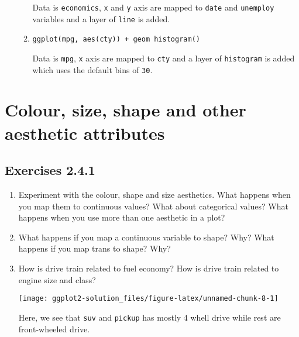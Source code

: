 \documentclass[]{book}
\newenvironment{Shaded}{\begin{snugshade}}{\end{snugshade}}
\newcommand{\KeywordTok}[1]{\textcolor[rgb]{0.13,0.29,0.53}{\textbf{#1}}}
\newcommand{\DataTypeTok}[1]{\textcolor[rgb]{0.13,0.29,0.53}{#1}}
\newcommand{\StringTok}[1]{\textcolor[rgb]{0.31,0.60,0.02}{#1}}
\newcommand{\OperatorTok}[1]{\textcolor[rgb]{0.81,0.36,0.00}{\textbf{#1}}}
\newcommand{\NormalTok}[1]{#1}
\begin{document}
\begin{enumerate}
\begin{enumerate}
    Data is \texttt{economics}, \texttt{x} and \texttt{y} axis are
    mapped to \texttt{date} and \texttt{unemploy} variables and a layer
    of \texttt{line} is added.
  \item
    \texttt{ggplot(mpg,\ aes(cty))\ +\ geom\ histogram()}

    Data is \texttt{mpg}, \texttt{x} axis are mapped to \texttt{cty} and
    a layer of \texttt{histogram} is added which uses the default bins
    of \texttt{30}.
  \end{enumerate}
\end{enumerate}

\section{Colour, size, shape and other aesthetic
attributes}\label{colour-size-shape-and-other-aesthetic-attributes}

\subsection{Exercises 2.4.1}\label{exercises-2.4.1}

\begin{enumerate}
\def\labelenumi{\arabic{enumi}.}
\item
  Experiment with the colour, shape and size aesthetics. What happens
  when you map them to continuous values? What about categorical values?
  What happens when you use more than one aesthetic in a plot?
\item
  What happens if you map a continuous variable to shape? Why? What
  happens if you map trans to shape? Why?
\item
  How is drive train related to fuel economy? How is drive train related
  to engine size and class?

\begin{Shaded}
\end{Shaded}

  \texttt{[image: ggplot2-solution\_files/figure-latex/unnamed-chunk-8-1]}

  Here, we see that \texttt{suv} and \texttt{pickup} has mostly 4 whell
  drive while rest are front-wheeled drive.
\end{enumerate}
\end{document}

